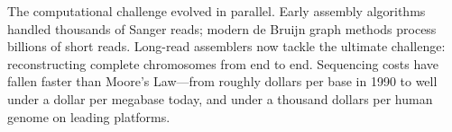 \begin{historical}
The computational challenge evolved in parallel. Early assembly algorithms handled thousands of Sanger reads; modern de Bruijn graph methods process billions of short reads. Long-read assemblers now tackle the ultimate challenge: reconstructing complete chromosomes from end to end. Sequencing costs have fallen faster than Moore's Law—from roughly dollars per base in 1990 to well under a dollar per megabase today, and under a thousand dollars per human genome on leading platforms.

\end{historical}
